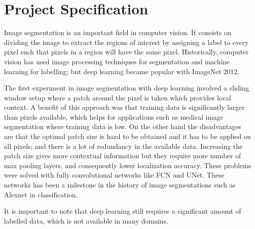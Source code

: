 \documentclass[]{UCD_CS_FYP_Report}
\begin{document}
\maketitle


\chapter*{Project Specification}
Image segmentation is an important field in computer vision. It consists on dividing the image to extract the regions of interest by assigning a label to every pixel such that pixels in a region will have the same pixel. Historically, computer vision has used image processing techniques for segmentation and machine learning for labelling; but deep learning became popular with ImageNet 2012.

The first experiment in image segmentation with deep learning involved a sliding window setup where a patch around the pixel is taken which provides local context. A benefit of this approach was that training data is significantly larger than pixels available, which helps for applications such as medical image segmentation where training data is low. On the other hand the disadvantages are that the optimal patch size is hard to be obtained and it has to be applied on all pixels; and there is a lot of redundancy in the available data. Increasing the patch size gives more contextual information but they require more number of max pooling layers, and consequently lower localization accuracy. These problems were solved with fully convolutional networks like FCN and UNet. These networks has been a milestone in the history of image segmentations such as Alexnet in classification.

It is important to note that deep learning still requires a significant amount of labelled data, which is not available in many domains.
\end{document}
